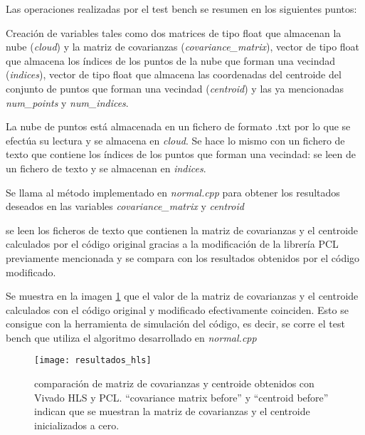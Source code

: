 Las operaciones realizadas por el test bench se resumen en los siguientes puntos:

\begin{list}{•}
\item Creación de variables tales como dos matrices de tipo float que almacenan la nube (\textit{cloud}) y la matriz de covarianzas (\textit{covariance\_matrix}), vector de tipo float que almacena los índices de los puntos de la nube que forman una vecindad (\textit{indices}), vector de tipo float que almacena las coordenadas del centroide del conjunto de puntos que forman una vecindad (\textit{centroid}) y las ya mencionadas \textit{num\_points} y \textit{num\_indices}.

\item La nube de puntos está almacenada en un fichero de formato .txt por lo que se efectúa su lectura y se almacena en \textit{cloud}. Se hace lo mismo con un fichero de texto que contiene los índices de los puntos que forman una vecindad: se leen de un fichero de texto y se almacenan en \textit{indices}.

\item Se llama al método implementado en \textit{normal.cpp} para obtener los resultados deseados en las variables \textit{covariance\_matrix} y \textit{centroid}

\item se leen los ficheros de texto que contienen la matriz de covarianzas y el centroide calculados por el código original gracias a la modificación de la librería PCL previamente mencionada y se compara con los resultados obtenidos por el código modificado.
\end{list}

Se muestra en la imagen \ref{fig:resultados_hls} que el valor de la matriz de covarianzas y el centroide calculados con el código original y modificado efectivamente coinciden. Esto se consigue con la herramienta de simulación del código, es decir, se corre el test bench que utiliza el algoritmo desarrollado en \textit{normal.cpp}

\begin{figure}
\centering
\texttt{[image: resultados\_hls]}
\caption{comparación de matriz de covarianzas y centroide obtenidos con Vivado HLS y PCL. ``covariance matrix before'' y ``centroid before'' indican que se muestran la matriz de covarianzas y el centroide inicializados a cero.}\label{fig:resultados_hls}
\end{figure}



